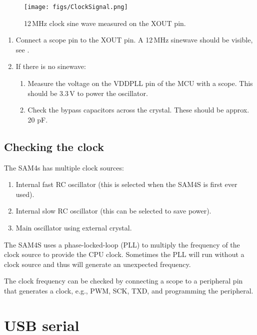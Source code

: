 \begin{figure}
\centering
\texttt{[image: figs/ClockSignal.png]}
\caption{12\,MHz clock sine wave measured on the XOUT pin.}
\label{fig:xout}
\end{figure}


\begin{enumerate}
\item Connect a scope pin to the XOUT pin. A 12\,MHz sinewave should
  be visible, see .
  
\item If there is no sinewave:

  \begin{enumerate}
  \item Measure the voltage on the VDDPLL pin of the MCU with a
    scope. This should be 3.3\,V to power the oscillator.
    
  \item Check the bypass capacitors across the crystal.  These should
    be approx. 20 pF.
  \end{enumerate}
\end{enumerate}


\subsection{Checking the clock}
\label{checking-the-clock}

The SAM4s has multiple clock sources:

\begin{enumerate}
\item
  Internal fast RC oscillator (this is selected when the SAM4S is first
  ever used).
\item
  Internal slow RC oscillator (this can be selected to save power).
\item
  Main oscillator using external crystal.
\end{enumerate}

The SAM4S uses a phase-locked-loop (PLL) to multiply the frequency of
the clock source to provide the CPU clock. Sometimes the PLL will run
without a clock source and thus will generate an unexpected frequency.

The clock frequency can be checked by connecting a scope to a
peripheral pin that generates a clock, e.g., PWM, SCK, TXD, and
programming the peripheral.


\section{USB serial}
\label{debugging-usb}

